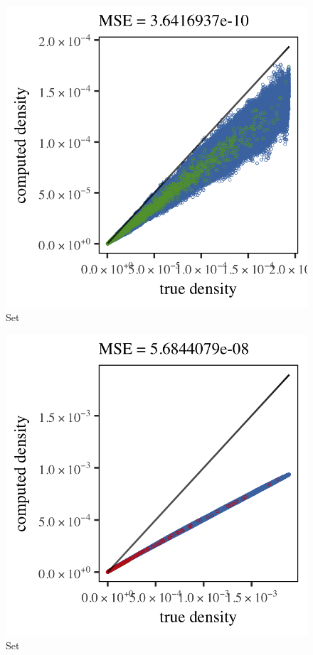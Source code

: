 
\begin{subfigure}{0.3\textwidth}
	\centering
	\includegraphics[keepaspectratio=true, width=\textwidth, height=0.23\textheight]{4/img/results_ferdosi_1_600000_mbe_breiman}
	\caption{Set \ferdosiOne}
	\label{fig:4:simulated:datasets:mbe:ferdosi1}
\end{subfigure}
\begin{subfigure}{0.3\textwidth}
	\centering
	\includegraphics[keepaspectratio=true, width=\textwidth, height=0.23\textheight]{4/img/results_ferdosi_2_600000_mbe_breiman}
	\caption{Set \ferdosiTwo}
	\label{fig:4:simulated:datasets:mbe:ferdosi2}
\end{subfigure}	
